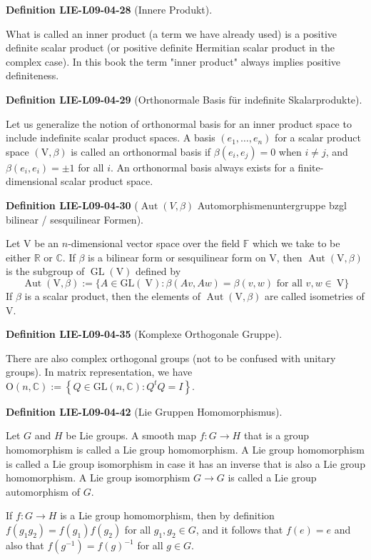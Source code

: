 \documentclass[10pt, letterpaper]{article}
\newcommand{\CustomHeading}[3]{%
  \par\medskip\noindent%
  \textbf{#1 #2} \textnormal{(#3)}.\enskip%
}
\newenvironment{DEF}[2]{\CustomHeading{Definition}{#1}{#2}}{}
\begin{document}
\begin{DEF}{LIE-L09-04-28}{Innere Produkt}
What is called an inner product (a term we have already used) is a positive definite scalar product (or positive definite Hermitian scalar product in the complex case). In this book the term "inner product" always implies positive definiteness.
\end{DEF}

\begin{DEF}{LIE-L09-04-29}{Orthonormale Basis für indefinite Skalarprodukte}
Let us generalize the notion of orthonormal basis for an inner product space to include indefinite scalar product spaces. A basis $\left(e_{1}, \ldots, e_{n}\right)$ for a scalar product space $(\mathrm{V}, \beta)$ is called an orthonormal basis if $\beta\left(e_{i}, e_{j}\right)=0$ when $i \neq j$, and $\beta\left(e_{i}, e_{i}\right)= \pm 1$ for all $i$. An orthonormal basis always exists for a finite-dimensional scalar product space.
\end{DEF}

\begin{DEF}{LIE-L09-04-30}{$\operatorname{Aut}(V,\beta)$ Automorphismenuntergruppe bzgl bilinear / sesquilinear Formen}
Let V be an $n$-dimensional vector space over the field $\mathbb{F}$ which we take to be either $\mathbb{R}$ or $\mathbb{C}$. If $\beta$ is a bilinear form or sesquilinear form on V, then $\operatorname{Aut}(\mathrm{V}, \beta)$ is the subgroup of $\operatorname{GL}(\mathrm{V})$ defined by
$$
\operatorname{Aut}(\mathrm{V}, \beta):=\{A \in \mathrm{GL}(\mathrm{~V}): \beta(A v, A w)=\beta(v, w) \text { for all } v, w \in \mathrm{~V}\}
$$
If $\beta$ is a scalar product, then the elements of $\operatorname{Aut}(\mathrm{V}, \beta)$ are called isometries of V.
\end{DEF}

\begin{DEF}{LIE-L09-04-35}{Komplexe Orthogonale Gruppe}
There are also complex orthogonal groups (not to be confused with unitary groups). In matrix representation, we have $\mathrm{O}(n, \mathbb{C}):= \left\{Q \in \mathrm{GL}(n, \mathbb{C}): Q^{t} Q=I\right\}$.
\end{DEF}

\begin{DEF}{LIE-L09-04-42}{Lie Gruppen Homomorphismus}
Let $G$ and $H$ be Lie groups. A smooth map $f: G \rightarrow H$ that is a group homomorphism is called a Lie group homomorphism. A Lie group homomorphism is called a Lie group isomorphism in case it has an inverse that is also a Lie group homomorphism. A Lie group isomorphism $G \rightarrow G$ is called a Lie group automorphism of $G$.

If $f: G \rightarrow H$ is a Lie group homomorphism, then by definition $f\left(g_{1} g_{2}\right)= f\left(g_{1}\right) f\left(g_{2}\right)$ for all $g_{1}, g_{2} \in G$, and it follows that $f(e)=e$ and also that $f\left(g^{-1}\right)=f(g)^{-1}$ for all $g \in G$.
\end{DEF}
\end{document}
